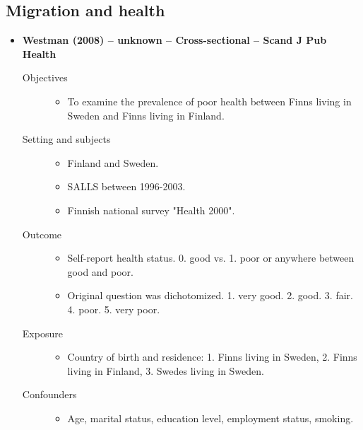 \documentclass{article}
\begin{document}
\subsection{Migration and health}
\begin{itemize}
	\item{\bf Westman (2008) -- unknown -- Cross-sectional -- Scand J Pub Health} 
		\begin{description}
			\item[Objectives]\mbox{}\par
				\begin{itemize}
					\item To examine the prevalence of poor health between Finns living in Sweden and Finns living in Finland.
				\end{itemize}
			\item[Setting and subjects]\mbox{}\par 
				\begin{itemize}
					\item Finland and Sweden. 
					\item SALLS between 1996-2003.
					\item Finnish national survey "Health 2000".
				\end{itemize}
			\item[Outcome]\mbox{}\par
				\begin{itemize}
					\item Self-report health status. 0. good vs. 1. poor or anywhere between good and poor.
					\item Original question was dichotomized. 1. very good. 2. good. 3. fair. 4. poor. 5. very poor.
				\end{itemize}
			\item[Exposure] \mbox{}\par
				\begin{itemize}
					\item Country of birth and residence: 1. Finns living in Sweden, 2. Finns living in Finland, 3. Swedes living in Sweden.
				\end{itemize}
			\item[Confounders] \mbox{}\par
				\begin{itemize}
					\item Age, marital status, education level, employment status, smoking.
				\end{itemize}

\end{description}
\end{itemize}
\end{document}
